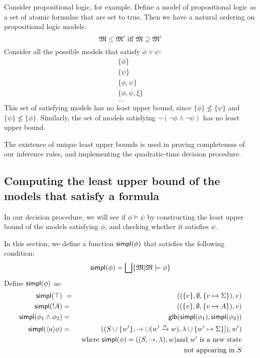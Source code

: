 Consider propositional logic, for example.
Define a model of propositional logic as a set of atomic formulae that are set to true.
Then we have a natural ordering  on propositional logic models:
\[
\frak{M} \leq \frak{M}' \text{ iff } \frak{M} \supseteq \frak{M}'
\]
Consider all the possible models that satisfy $\phi \lor \psi$:
\begin{eqnarray*}
\{\phi\} \\
\{\psi\} \\
\{\phi, \psi\} \\
\{\phi, \psi, \xi\}\\
...
\end{eqnarray*}
This set of satisfying models has no least upper bound, since $\{\phi\} \nleq \{\psi\}$ and $\{\psi\} \nleq \{\phi\}$.
Similarly,  the set of models satisfying $\neg (\neg \phi \land \neg \psi)$ has no least upper bound.

The existence of unique least upper bounds is used in proving
completeness of our inference rules, and implementing the quadratic-time
decision procedure.

\subsection{Computing the least upper bound of the models that satisfy a formula}
\label{simpl}

In our decision procedure, we will see if $\phi \models \psi$ by constructing the least upper bound of the models satisfying $\phi$, and checking whether it satisfies $\psi$.

In this section, we define a function $\mathsf{simpl}(\phi)$ that satisfies the following condition:
\[
\mathsf{simpl}(\phi) = \bigsqcup \{ \frak{M} | \frak{M} \models \phi \}
\]
Define $\mathsf{simpl}(\phi)$ as:
\begin{eqnarray*}
  \mathsf{simpl}(\top) &\ = \ & ( (\{v\}, \emptyset, \{v \mapsto \Sigma\}), v)  \\
  \mathsf{simpl}(! A) & = & ( (\{v\}, \emptyset, \{v \mapsto A\}), v)  \\
  \mathsf{simpl}(\phi_1 \land \phi_2) & = & \mathsf{glb} (\mathsf{simpl}(\phi_1), \mathsf{simpl}(\phi_2))  \\
  \mathsf{simpl}(\langle a \rangle \phi) 
     & = & ( (S \cup \{w'\}, \rightarrow \cup (w' \xrightarrow{a} w), \lambda \cup \{w' \mapsto \Sigma\}]), w')  \\
		& & \mbox{where }\mathsf{simpl}(\phi) = ( (S, \rightarrow, \lambda), w) \mbox{and } w' \mbox{ is a new state} \\
                &&  \mbox{not appearing in }S 
\end{eqnarray*}

